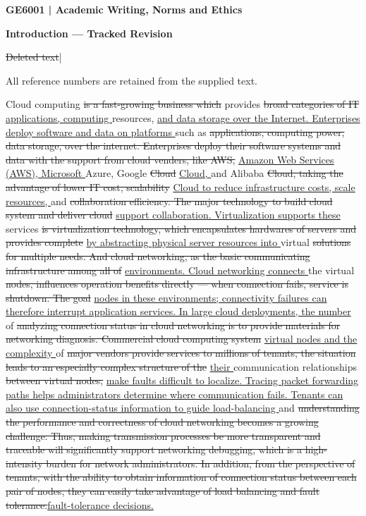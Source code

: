\documentclass[11pt,a4paper]{article}
\newcommand{\deleted}[1]{{\color{deletion}\sout{#1}}}
\newcommand{\added}[1]{{\color{insertion}\uline{#1}}}
\newif\ifmarkedsection
\begin{document}
\ifmarkedsection
{\Large\bfseries GE6001 | Academic Writing, Norms and Ethics\par}
{\large\bfseries Introduction --- Tracked Revision\par}
{\small \deleted{Deleted text}\quad |\quad \added{Inserted text}\par}
{\small All reference numbers are retained from the supplied text.\par}

Cloud computing \deleted{is a fast-growing business which }provides \deleted{broad categories of IT }\added{applications, computing }resources, \added{and data storage over the Internet. Enterprises deploy software and data on platforms }such as \deleted{applications, computing power, data storage, over the internet. Enterprises deploy their software systems and data with the support from cloud venders, like AWS, }\added{Amazon Web Services (AWS), Microsoft }Azure, Google \deleted{Cloud }\added{Cloud, }and Alibaba \deleted{Cloud, taking the advantage of lower IT cost, scalability }\added{Cloud to reduce infrastructure costs, scale resources, }and \deleted{collaboration efficiency. The major technology to build cloud system and deliver cloud }\added{support collaboration. Virtualization supports these }services \deleted{is virtualization technology, which encapsulates hardwares of servers and provides complete }\added{by abstracting physical server resources into }virtual \deleted{solutions for multiple needs. And cloud networking, as the basic communicating infrastructure among all of }\added{environments. Cloud networking connects }the virtual \deleted{nodes, influences operation benefits directly --- when connection fails, service is shutdown. The goal }\added{nodes in these environments; connectivity failures can therefore interrupt application services. In large cloud deployments, the number }of \deleted{analyzing connection status in cloud networking is to provide materials for networking diagnosis. Commercial cloud computing system }\added{virtual nodes and the complexity }of \deleted{major vendors provide services to millions of tenants, the situation leads to an especially complex structure of the }\added{their }communication relationships \deleted{between virtual nodes, }\added{make faults difficult to localize. Tracing packet forwarding paths helps administrators determine where communication fails. Tenants can also use connection-status information to guide load-balancing }and \deleted{understanding the performance and correctness of cloud networking becomes a growing challenge. Thus, making transmission processes be more transparent and traceable will significantly support networking debugging, which is a high-intensity burden for network administrators. In addition, from the perspective of tenants, with the ability to obtain information of connection status between each pair of nodes, they can easily take advantage of load balancing and fault tolerance.}\added{fault-tolerance decisions.}
\end{document}
